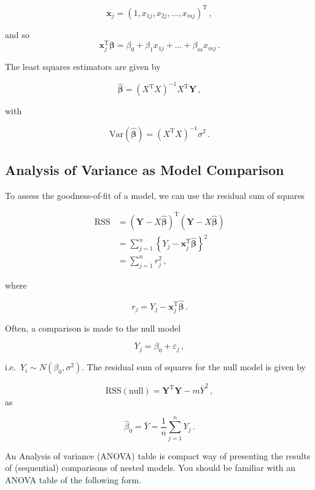 \documentclass[
]{book}
\theoremstyle{definition}
\theoremstyle{definition}
\theoremstyle{definition}
\theoremstyle{definition}
\theoremstyle{remark}
\begin{document}
\[
\boldsymbol{x}_j=(1,x_{1j},x_{2j},\dots,x_{mj})^{\textrm{T}}\,,
\]

and so
\[
\boldsymbol{x}_j^{\textrm{T}}\boldsymbol{\beta}=\beta_{0}+\beta_{1}x_{1j}+\dots+\beta_{m}x_{mj}\,.
\]

The least squares estimators are given by

\begin{equation}
\hat{\boldsymbol{\beta}}=(X^{\textrm{T}}X)^{-1}X^{\textrm{T}}\boldsymbol{Y}\,,\nonumber
\end{equation}

with

\begin{equation}
\textrm{Var}(\hat{\boldsymbol{\beta}})=(X^{\textrm{T}}X)^{-1}\sigma^{2}\,.\nonumber
\end{equation}

\hypertarget{anova-revision}{%
\subsection{Analysis of Variance as Model Comparison}\label{anova-revision}}

To assess the goodness-of-fit of a model, we can use the residual sum of squares

\begin{align*}
\textrm{RSS} & = (\boldsymbol{Y} - X\hat{\boldsymbol{\beta}})^{\textrm{T}} (\boldsymbol{Y} - X\hat{\boldsymbol{\beta}})\\
& = \sum^{n}_{j=1}\left\{Y_{j}-\boldsymbol{x}_{j}^{\textrm{T}}\hat{\boldsymbol{\beta}}\right\}^{2}\\
& = \sum^{n}_{j=1}r_{j}^{2}\,,
\end{align*}

where

\[
r_{j}=Y_{j}-\boldsymbol{x}_{j}^{\textrm{T}}\hat{\boldsymbol{\beta}}\,.
\]

Often, a comparison is made to the null model

\[
Y_{j}=\beta_{0}+\varepsilon_{j}\,,
\]

i.e.~\(Y_{i}\sim N(\beta_{0},\sigma^{2})\). The residual sum of squares for the null model is given by

\[
\textrm{RSS}(\textrm{null}) = \boldsymbol{Y}^{\textrm{T}}\boldsymbol{Y} - m\bar{Y}^{2}\,,
\]
as

\[
\hat{\beta}_{0} = \bar{Y} = \frac{1}{n}\sum_{j=1}^n Y_{j}\,.
\]

An Analysis of variance (ANOVA) table is compact way of presenting the results of (sequential) comparisons of nested models. You should be familiar with an ANOVA table of the following form.
\end{document}
